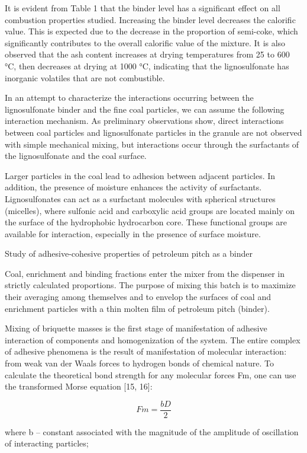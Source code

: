 It is evident from Table 1 that the binder level has a significant
effect on all combustion properties studied. Increasing the binder level
decreases the calorific value. This is expected due to the decrease in
the proportion of semi-coke, which significantly contributes to the
overall calorific value of the mixture. It is also observed that the ash
content increases at drying temperatures from 25 to 600 °C, then
decreases at drying at 1000 °C, indicating that the lignosulfonate has
inorganic volatiles that are not combustible.

In an attempt to characterize the interactions occurring between the
lignosulfonate binder and the fine coal particles, we can assume the
following interaction mechanism. As preliminary observations show,
direct interactions between coal particles and lignosulfonate particles
in the granule are not observed with simple mechanical mixing, but
interactions occur through the surfactants of the lignosulfonate and the
coal surface.

Larger particles in the coal lead to adhesion between adjacent
particles. In addition, the presence of moisture enhances the activity
of surfactants. Lignosulfonates can act as a surfactant molecules with
spherical structures (micelles), where sulfonic acid and carboxylic acid
groups are located mainly on the surface of the hydrophobic hydrocarbon
core. These functional groups are available for interaction, especially
in the presence of surface moisture.

Study of adhesive-cohesive properties of petroleum pitch as a binder

Coal, enrichment and binding fractions enter the mixer from the
dispenser in strictly calculated proportions. The purpose of mixing this
batch is to maximize their averaging among themselves and to envelop the
surfaces of coal and enrichment particles with a thin molten film of
petroleum pitch (binder).

Mixing of briquette masses is the first stage of manifestation of
adhesive interaction of components and homogenization of the system. The
entire complex of adhesive phenomena is the result of manifestation of
molecular interaction: from weak van der Waals forces to hydrogen bonds
of chemical nature. To calculate the theoretical bond strength for any
molecular forces Fm, one can use the transformed Morse equation {[}15,
16{]}:

\[Fm = \frac{bD}{2}\]

where b -- constant associated with the magnitude of the amplitude of
oscillation of interacting particles;

